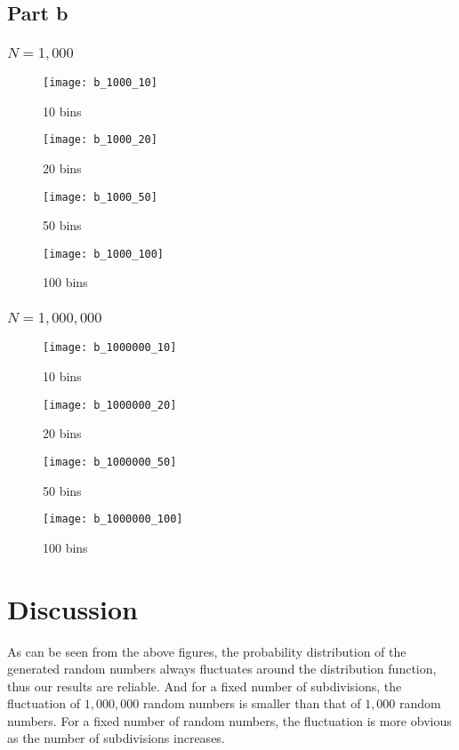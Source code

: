 \documentclass[a4paper]{article}
\begin{document}
	\subsection{Part b}
	\subsubsection{$N = 1,000$}
		\begin{figure}[H]
		\centering
		\texttt{[image: b\_1000\_10]}
		\caption{10 bins}	
		\label{b_3_10}
		\texttt{[image: b\_1000\_20]}
		\caption{20 bins}	
		\label{b_3_20}
	\end{figure}
	\newpage
	\begin{figure}[H]
		\centering
		\texttt{[image: b\_1000\_50]}
		\caption{50 bins}	
		\label{b_3_50}
		\texttt{[image: b\_1000\_100]}
		\caption{100 bins}	
		\label{b_3_100}
	\end{figure}
	\subsubsection{$N = 1,000,000$}
		\begin{figure}[H]
		\centering
		\texttt{[image: b\_1000000\_10]}
		\caption{10 bins}	
		\label{b_6_10}
		\texttt{[image: b\_1000000\_20]}
		\caption{20 bins}	
		\label{b_6_20}
	\end{figure}
	\newpage
	\begin{figure}[H]
		\centering
		\texttt{[image: b\_1000000\_50]}
		\caption{50 bins}	
		\label{b_6_50}
		\texttt{[image: b\_1000000\_100]}
		\caption{100 bins}	
		\label{b_6_100}
	\end{figure}
	\newpage
	\section{Discussion}
		As can be seen from the above figures, the probability distribution of the generated random numbers always fluctuates around the distribution function, thus our results are reliable. And for a fixed number of subdivisions, the fluctuation of $1,000,000$ random numbers is smaller than that of $1,000$ random numbers. For a fixed number of random numbers, the fluctuation is more obvious as the number of subdivisions increases.
\end{document}
